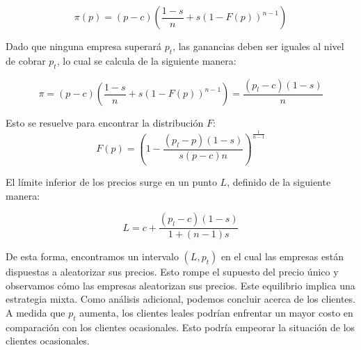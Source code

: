 \documentclass[11pt]{article}
\begin{document}
\begin{flushleft}
    $$\pi(p)=(p-c)\left(\frac{1-s}{n}+s(1-F(p))^{n-1} \right)$$

    Dado que ninguna empresa superará $p_t$, las ganancias deben ser iguales al nivel de cobrar $p_t$, lo cual se calcula de la siguiente manera:
    
    $$\pi=(p-c)\left(\frac{1-s}{n}+s(1-F(p))^{n-1} \right)=\frac{(p_l-c)(1-s)}{n}$$

    Esto se resuelve para encontrar la distribución $F$:
    $$F(p)=\left(1-\frac{(p_l-p)(1-s)}{s(p-c)n}\right)^{\frac{1}{n-1}}$$

    El límite inferior de los precios surge en un punto $L$, definido de la siguiente manera:

    $$L=c+\frac{(p_l-c)(1-s)}{1+(n-1)s}$$

    De esta forma, encontramos un intervalo $(L, p_t)$ en el cual las empresas están dispuestas a aleatorizar sus precios. Esto rompe el supuesto del precio único y observamos cómo las empresas aleatorizan sus precios. Este equilibrio implica una estrategia mixta. Como análisis adicional, podemos concluir acerca de los clientes. A medida que $p_t$ aumenta, los clientes leales podrían enfrentar un mayor costo en comparación con los clientes ocasionales. Esto podría empeorar la situación de los clientes ocasionales.
\end{flushleft}
\end{document}
